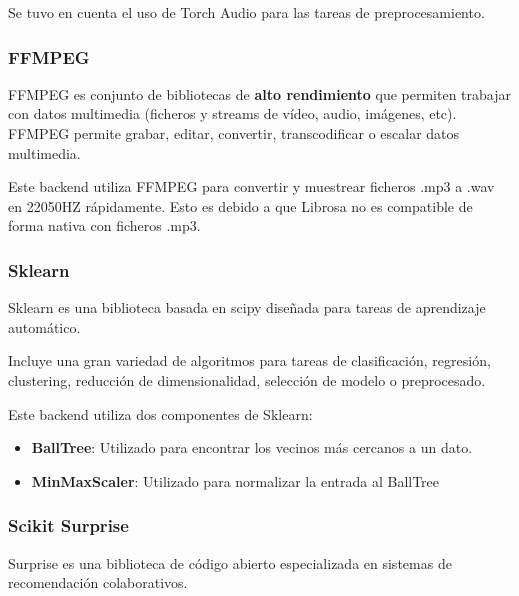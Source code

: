 Se tuvo en cuenta el uso de Torch Audio para las tareas de
preprocesamiento.

\hypertarget{ffmpeg}{%
\subsubsection{FFMPEG}\label{ffmpeg}}

FFMPEG es conjunto de bibliotecas de \textbf{alto rendimiento} que
permiten trabajar con datos multimedia (ficheros y streams de vídeo,
audio, imágenes, etc). FFMPEG permite grabar, editar, convertir,
transcodificar o escalar datos multimedia.

Este backend utiliza FFMPEG para convertir y muestrear ficheros .mp3 a
.wav en 22050HZ rápidamente. Esto es debido a que Librosa no es
compatible de forma nativa con ficheros .mp3.

\hypertarget{section-2}{%
\subsubsection{}\label{section-2}}

\hypertarget{sklearn}{%
\subsubsection{Sklearn}\label{sklearn}}

Sklearn es una biblioteca basada en scipy diseñada para tareas de
aprendizaje automático.

Incluye una gran variedad de algoritmos para tareas de clasificación,
regresión, clustering, reducción de dimensionalidad, selección de modelo
o preprocesado.

Este backend utiliza dos componentes de Sklearn:

\begin{itemize}
\item
  \textbf{BallTree}: Utilizado para encontrar los vecinos más cercanos a
  un dato.
\item
  \textbf{MinMaxScaler}: Utilizado para normalizar la entrada al
  BallTree
\end{itemize}

\hypertarget{scikit-surprise}{%
\subsubsection{Scikit Surprise}\label{scikit-surprise}}

Surprise es una biblioteca de código abierto especializada en sistemas
de recomendación colaborativos.

